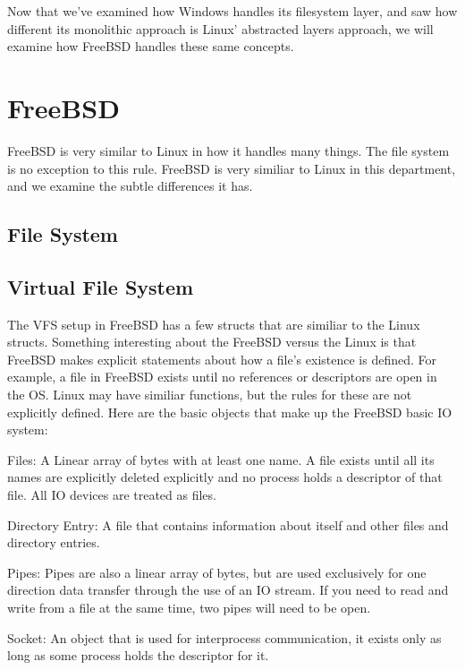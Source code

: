 \documentclass[10pt,letterpaper,onecolumn,draftclsnofoot]{IEEEtran}
\begin{document}
  Now that we've examined how Windows handles its filesystem layer, and saw how
  different its monolithic approach is Linux' abstracted layers approach, we will
  examine how FreeBSD handles these same concepts.

\section{FreeBSD}
  FreeBSD is very similar to Linux in how it handles many things. The file system
  is no exception to this rule. FreeBSD is very similiar to Linux in this department,
  and we examine the subtle differences it has.
 \subsection{File System}

 \subsection{Virtual File System}
 The VFS setup in FreeBSD has a few structs that are similiar to the Linux structs.
 Something interesting about the FreeBSD versus the Linux is that FreeBSD
 makes explicit statements about how a file's existence is defined. For example,
 a file in FreeBSD exists until no references or descriptors are open in the OS.
 Linux may have similiar functions, but the rules for these are not explicitly
 defined. Here are the basic objects that make up the FreeBSD basic IO system:
 \cite{freebsd2016}
 \begin{description}
   \item Files: A Linear array of bytes with at least one name. A file exists
   until all its names are explicitly deleted explicitly and no process holds a
   descriptor of that file. All IO devices are treated as files.
   \item Directory Entry: A file that contains information about itself and
   other files and directory entries.
   \item Pipes: Pipes are also a linear array of bytes, but are used exclusively
   for one direction data transfer through the use of an IO stream. If you need
   to read and write from a file at the same time, two pipes will need to be open.
   \item Socket: An object that is used for interprocess communication, it exists
   only as long as some process holds the descriptor for it.
 \end{description}
\end{document}
